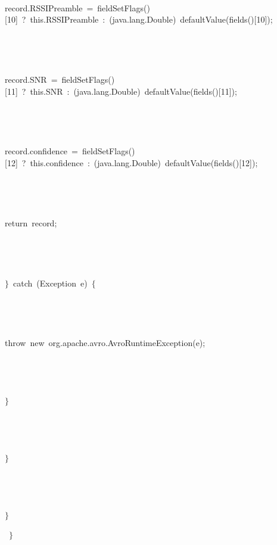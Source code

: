 {{{\ }}{\hlstd\ \ \ \ \ \ \ \ }{\hlstd record.RSSIPreamble\ $\mathord{=}$\ fieldSetFlags()[10]\ ?\ this.RSSIPreamble\ :\ (java.lang.Double)\ defaultValue(fields()[10]);\leavevmode\par
{\ }}{\hlstd\ \ \ \ \ \ \ \ }{\hlstd record.SNR\ $\mathord{=}$\ fieldSetFlags()[11]\ ?\ this.SNR\ :\ (java.lang.Double)\ defaultValue(fields()[11]);\leavevmode\par
{\ }}{\hlstd\ \ \ \ \ \ \ \ }{\hlstd record.confidence\ $\mathord{=}$\ fieldSetFlags()[12]\ ?\ this.confidence\ :\ (java.lang.Double)\ defaultValue(fields()[12]);\leavevmode\par
{\ }}{\hlstd\ \ \ \ \ \ \ \ }{\hlstd return\ record;\leavevmode\par
{\ }}{\hlstd\ \ \ \ \ \ }{\hlstd $\}$\ catch\ (Exception\ e)\ $\{$\leavevmode\par
{\ }}{\hlstd\ \ \ \ \ \ \ \ }{\hlstd throw\ new\ org.apache.avro.AvroRuntimeException(e);\leavevmode\par
{\ }}{\hlstd\ \ \ \ \ \ }{\hlstd $\}$\leavevmode\par
{\ }}{\hlstd\ \ \ \ }{\hlstd $\}$\leavevmode\par
{\ }}{\hlstd\ \ }{\hlstd $\}$\leavevmode\par
{\ }$\}$}\leavevmode\par
}
